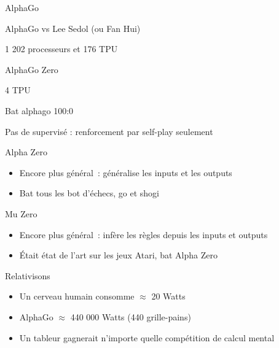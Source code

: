 \begin{frame}{AlphaGo}
  \begin{center}
    AlphaGo vs Lee Sedol (ou Fan Hui)
  \end{center}
  \huge
  1 202 processeurs et 176 TPU
\end{frame}

\begin{frame}{AlphaGo Zero}
  \begin{description}[<+->]
    \item[Plus simple] 4 TPU
    \item[Plus fort] Bat alphago 100:0
    \item[Plus général] Pas de supervisé : renforcement par self-play seulement
  \end{description}
\end{frame}

\begin{frame}{Alpha Zero}
  \begin{itemize}[<+->]
    \item Encore plus général~: généralise les inputs et les outputs
    \item Bat tous les bot d'échecs, go et shogi
  \end{itemize}  
\end{frame}

\begin{frame}{Mu Zero}
  \begin{itemize}[<+->]
    \item Encore plus général~: infère les règles depuis les inputs et outputs
    \item Était état de l'art sur les jeux Atari, bat Alpha Zero
  \end{itemize}
\end{frame}

\begin{frame}{Relativisons}
  \begin{itemize}[<+->]
    \item Un cerveau humain consomme $\approx$ 20 Watts
    \item AlphaGo $\approx$ 440 000 Watts (440 grille-pains)
    \item Un tableur gagnerait n'importe quelle compétition de calcul mental
  \end{itemize}
\end{frame}

